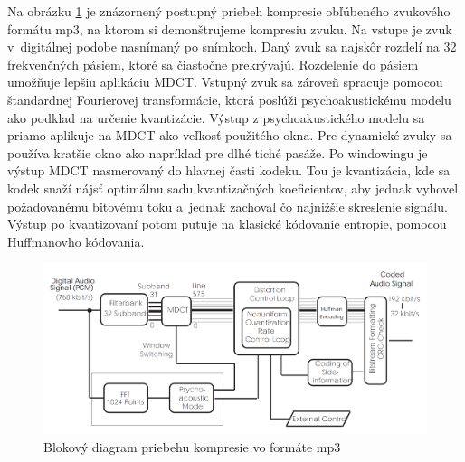Na obrázku \ref{fig:mp3_flow_diagram} je znázornený postupný priebeh
kompresie obľúbeného zvukového formátu mp3, na ktorom si demonštrujeme
kompresiu zvuku. Na vstupe je zvuk v~digitálnej podobe nasnímaný po
snímkoch. Daný zvuk sa najskôr rozdelí na 32 frekvenčných pásiem,
ktoré sa čiastočne prekrývajú. Rozdelenie do pásiem umožňuje lepšiu
aplikáciu MDCT. Vstupný zvuk sa zároveň spracuje pomocou štandardnej
Fourierovej transformácie, ktorá poslúži psychoakustickému modelu ako
podklad na určenie kvantizácie. Výstup z psychoakustického modelu sa
priamo aplikuje na MDCT ako veľkosť použitého okna. Pre dynamické
zvuky sa používa kratšie okno ako napríklad pre dlhé tiché pasáže.
Po windowingu je výstup MDCT nasmerovaný do hlavnej časti kodeku.
Tou je kvantizácia, kde sa kodek snaží nájsť optimálnu sadu
kvantizačných koeficientov, aby jednak vyhovel požadovanému bitovému
toku a~jednak zachoval čo najnižšie skreslenie signálu. Výstup po
kvantizovaní potom putuje na klasické kódovanie entropie, pomocou
Huffmanovho kódovania.

\begin{figure}[htp]
    \centering
    \includegraphics[width=12cm]{obrazky/informatika/audio/mp3_flow_diagram}
    \caption{Blokový diagram priebehu kompresie vo formáte mp3}
    \label{fig:mp3_flow_diagram}
\end{figure}

\nocite{mp3aac}
